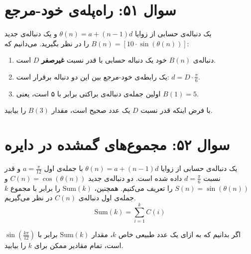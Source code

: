 \documentclass[12pt]{article}
\begin{document}
	\section*{سوال ۵۱: راه‌پله‌ی خود-مرجع }
	یک دنباله‌ی حسابی از زوایا \( \theta(n) = a + (n-1)d \) و یک دنباله‌ی جدید \( B(n) = [10 \cdot \sin(\theta(n))] \) را در نظر بگیرید. می‌دانیم که:
	\begin{enumerate}[label=(\roman*)]
		\item دنباله‌ی \(B(n)\) خود یک دنباله حسابی با قدر نسبت \textbf{غیرصفر} \(D\) است.
		\item یک رابطه‌ی خود-مرجع بین این دو دنباله برقرار است: \( d = D \cdot \frac{\pi}{6} \).
		\item اولین جمله‌ی دنباله‌ی براکتی برابر با ۵ است، یعنی \(B(1) = 5\).
	\end{enumerate}
	\vspace{0.5cm}
	با فرض اینکه قدر نسبت \(D\) یک عدد صحیح است، مقدار \(B(3)\) را بیابید.
	
	\vspace{1cm}
	\hrulefill
	\vspace{1cm}
	
	\section*{سوال ۵۲: مجموع‌های گمشده در دایره}
	یک دنباله‌ی حسابی از زوایا \( \theta(n) = a + (n-1)d \) با جمله‌ی اول \(a = \frac{\pi}{12}\) و قدر نسبت \(d = \frac{\pi}{6}\) داده شده است.
	دو دنباله‌ی جدید \( C(n) = \cos(\theta(n)) \) و \( S(n) = \sin(\theta(n)) \) را تعریف می‌کنیم.
	همچنین، \( \text{Sum}(k) \) را برابر با مجموع \(k\) جمله‌ی اول دنباله‌ی \(C(n)\) در نظر می‌گیریم.
	\begin{displaymath}
		\text{Sum}(k) = \sum_{i=1}^{k} C(i)
	\end{displaymath}
	\vspace{0.5cm}
	
	اگر بدانیم که به ازای یک عدد طبیعی خاص \(k\)، مقدار \( \text{Sum}(k) \) برابر با \( \sin(\frac{k\pi}{12}) \) است، تمام مقادیر ممکن برای \(k\) را بیابید.
	
	\vspace{1cm}
	\hrulefill
	\vspace{1cm}
	
\end{document}
